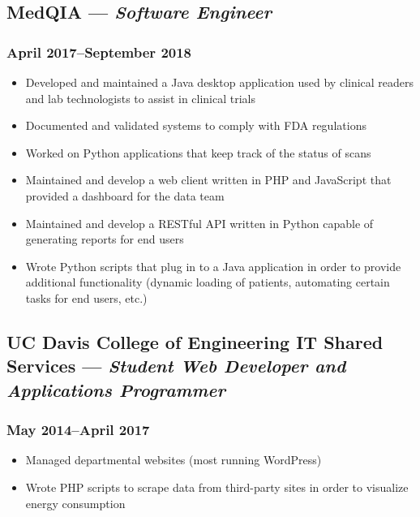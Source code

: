 \documentclass{article}
\begin{document}
\begin{minipage}[t]{.6\textwidth}
	\subsection*{MedQIA --- \textit{Software Engineer}}
	\subsubsection*{April 2017--September 2018}
	\begin{itemize}
		\item Developed and maintained a Java desktop application used by clinical readers
		      and lab technologists to assist in clinical trials
		\item Documented and validated systems to comply with FDA regulations
		\item Worked on Python applications that keep track of the status of scans
		\item Maintained and develop a web client written in PHP and JavaScript that provided
		      a dashboard for the data team
		\item Maintained and develop a RESTful API written in Python capable of generating
		      reports for end users
		\item Wrote Python scripts that plug in to a Java application in order to provide
		      additional functionality (dynamic loading of patients, automating certain tasks
		      for end users, etc.)
	\end{itemize}
	\subsection*{UC Davis College of Engineering IT Shared Services --- \textit{Student Web Developer and Applications Programmer}}
	\subsubsection*{May 2014--April 2017}
	\begin{itemize}
		\item Managed departmental websites (most running WordPress)
		\item Wrote PHP scripts to scrape data from third-party sites in order to visualize
		      energy consumption
	\end{itemize}
\end{minipage}
\hspace{0.08\textwidth}
\end{document}
